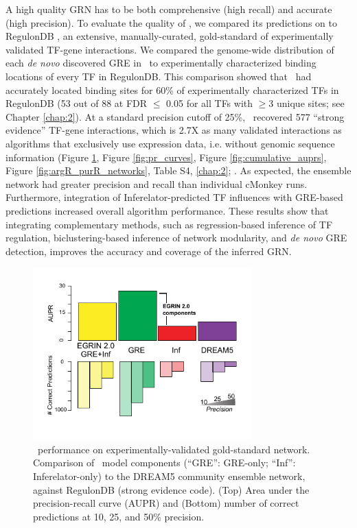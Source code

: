 A high quality GRN has to be both comprehensive (high recall) and accurate (high precision). To evaluate the quality of \egrine, we compared its predictions on \eco to RegulonDB \cite{gama-castro_regulondb_2011}, an extensive, manually-curated, gold-standard of experimentally validated TF-gene interactions. We compared the genome-wide distribution of each \textit{de novo} discovered GRE in \egrine~to experimentally characterized binding locations of every TF in RegulonDB. This comparison showed that \egrine~had accurately located binding sites for 60\% of experimentally characterized TFs in RegulonDB (53 out of 88 at FDR $\leq$ 0.05 for all TFs with $\geq$3 unique sites; see Chapter \ref{chap:2}). At a standard precision cutoff of 25\%, \egrine~recovered 577 ``strong evidence'' TF-gene interactions, which is 2.7X as many validated interactions as algorithms that exclusively use expression data, i.e. without genomic sequence information (Figure \ref{fig:egrin2:2:A}, Figure \ref{fig:pr_curves}, Figure \ref{fig:cumulative_auprs}, Figure \ref{fig:argR_purR_networks}, Table S4, \ref{chap:2}; \cite{faith_large-scale_2007,marbach_wisdom_2012}. As expected, the ensemble network had greater precision and recall than individual cMonkey runs. Furthermore, integration of Inferelator-predicted TF influences with GRE-based predictions increased overall algorithm performance. These results show that integrating complementary methods, such as regression-based inference of TF regulation, biclustering-based inference of network modularity, and \textit{de novo} GRE detection, improves the accuracy and coverage of the inferred GRN. 

\begin{figure}[h!]
    \centering
    \includegraphics[width=0.75\textwidth]{figures/egrin2_AUPR}
 	\caption[\egrine~Model Validation: Performance on RegulonDB]{\egrine~performance on experimentally-validated gold-standard network. Comparison of \egrine~model components (“GRE”: GRE-only; “Inf”: Inferelator-only) to the DREAM5 community ensemble network, against RegulonDB (strong evidence code). (Top) Area under the precision-recall curve (AUPR) and (Bottom) number of correct predictions at 10, 25, and 50\% precision. 
}
    \label{fig:egrin2:2:A}
\end{figure}

